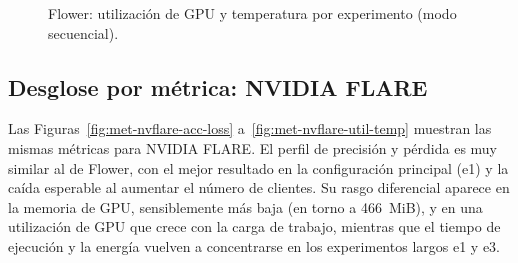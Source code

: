 \begin{figure}[htbp]
  \centering
  \begin{minipage}{0.48\textwidth}
    \centering
  \end{minipage}\hfill
  \begin{minipage}{0.48\textwidth}
    \centering
  \end{minipage}
  \caption{Flower: utilización de GPU y temperatura por experimento (modo secuencial).}
  \label{fig:met-flower-util-temp}
\end{figure}

\subsection{Desglose por métrica: NVIDIA FLARE}\label{sec:metricas-nvflare}

Las Figuras~\ref{fig:met-nvflare-acc-loss} a~\ref{fig:met-nvflare-util-temp} muestran las mismas
métricas para NVIDIA FLARE. El perfil de precisión y pérdida es muy similar al de Flower, con el
mejor resultado en la configuración principal (e1) y la caída esperable al aumentar el número de
clientes. Su rasgo diferencial aparece en la memoria de GPU, sensiblemente más baja (en torno a
466~MiB), y en una utilización de GPU que crece con la carga de trabajo, mientras que el tiempo
de ejecución y la energía vuelven a concentrarse en los experimentos largos e1 y e3.


